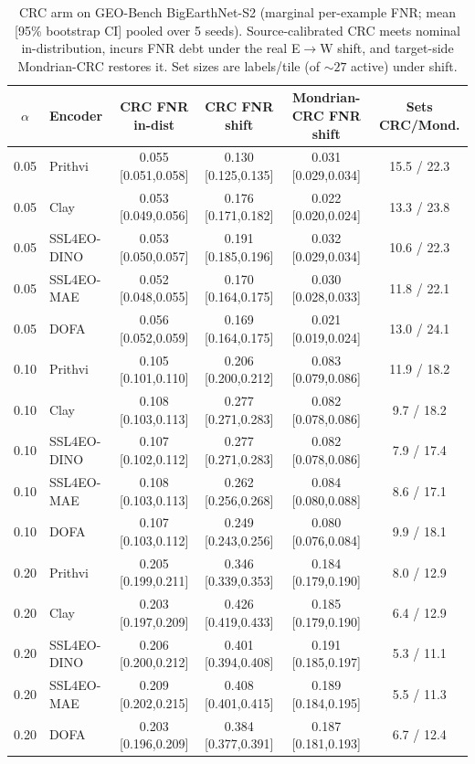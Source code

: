 \documentclass[journal]{IEEEtran}
\renewcommand{\_}{\textunderscore\allowbreak}
\begin{document}
\begin{table}[htbp]\centering\small
\caption{CRC arm on GEO-Bench BigEarthNet-S2 (marginal per-example FNR; mean [95\% bootstrap CI]
pooled over 5 seeds). Source-calibrated CRC meets nominal in-distribution, incurs FNR debt under the real
E$\to$W shift, and target-side Mondrian-CRC restores it. Set sizes are labels/tile (of ${\sim}27$ active)
under shift.}\label{tab:crc}
\begin{tabular}{clcccc}
\toprule
$\alpha$ & Encoder & CRC FNR in-dist & CRC FNR shift & Mondrian-CRC FNR shift & Sets CRC/Mond. \\
\midrule
0.05 & Prithvi & 0.055 [0.051,0.058] & 0.130 [0.125,0.135] & 0.031 [0.029,0.034] & 15.5 / 22.3 \\
0.05 & Clay & 0.053 [0.049,0.056] & 0.176 [0.171,0.182] & 0.022 [0.020,0.024] & 13.3 / 23.8 \\
0.05 & SSL4EO-DINO & 0.053 [0.050,0.057] & 0.191 [0.185,0.196] & 0.032 [0.029,0.034] & 10.6 / 22.3 \\
0.05 & SSL4EO-MAE & 0.052 [0.048,0.055] & 0.170 [0.164,0.175] & 0.030 [0.028,0.033] & 11.8 / 22.1 \\
0.05 & DOFA & 0.056 [0.052,0.059] & 0.169 [0.164,0.175] & 0.021 [0.019,0.024] & 13.0 / 24.1 \\
\midrule
0.10 & Prithvi & 0.105 [0.101,0.110] & 0.206 [0.200,0.212] & 0.083 [0.079,0.086] & 11.9 / 18.2 \\
0.10 & Clay & 0.108 [0.103,0.113] & 0.277 [0.271,0.283] & 0.082 [0.078,0.086] & 9.7 / 18.2 \\
0.10 & SSL4EO-DINO & 0.107 [0.102,0.112] & 0.277 [0.271,0.283] & 0.082 [0.078,0.086] & 7.9 / 17.4 \\
0.10 & SSL4EO-MAE & 0.108 [0.103,0.113] & 0.262 [0.256,0.268] & 0.084 [0.080,0.088] & 8.6 / 17.1 \\
0.10 & DOFA & 0.107 [0.103,0.112] & 0.249 [0.243,0.256] & 0.080 [0.076,0.084] & 9.9 / 18.1 \\
\midrule
0.20 & Prithvi & 0.205 [0.199,0.211] & 0.346 [0.339,0.353] & 0.184 [0.179,0.190] & 8.0 / 12.9 \\
0.20 & Clay & 0.203 [0.197,0.209] & 0.426 [0.419,0.433] & 0.185 [0.179,0.190] & 6.4 / 12.9 \\
0.20 & SSL4EO-DINO & 0.206 [0.200,0.212] & 0.401 [0.394,0.408] & 0.191 [0.185,0.197] & 5.3 / 11.1 \\
0.20 & SSL4EO-MAE & 0.209 [0.202,0.215] & 0.408 [0.401,0.415] & 0.189 [0.184,0.195] & 5.5 / 11.3 \\
0.20 & DOFA & 0.203 [0.196,0.209] & 0.384 [0.377,0.391] & 0.187 [0.181,0.193] & 6.7 / 12.4 \\
\bottomrule
\end{tabular}
\end{table}
\end{document}
